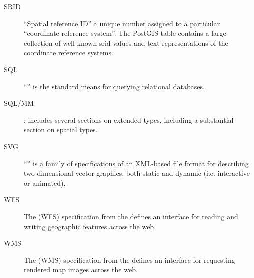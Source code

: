 \documentclass[a4paper,11pt,english]{sphinxmanual}
\begin{document}
\begin{description}
\item[{SRID\label{\detokenize{glossary:term-srid}}}] \leavevmode
“Spatial reference ID” a unique number assigned to a particular “coordinate reference system”. The PostGIS table  contains a large collection of well-known srid values and text representations of the coordinate reference systems.

\item[{SQL\label{\detokenize{glossary:term-sql}}}] \leavevmode
“” is the standard means for querying relational databases.

\item[{SQL/MM\label{\detokenize{glossary:term-sql-mm}}}] \leavevmode
{}; includes several sections on extended types, including a substantial section on spatial types.

\item[{SVG\label{\detokenize{glossary:term-svg}}}] \leavevmode
“” is a family of specifications of an XML-based file format for describing two-dimensional vector graphics, both static and dynamic (i.e. interactive or animated).

\item[{WFS\label{\detokenize{glossary:term-wfs}}}] \leavevmode
The  (WFS) specification from the {\hyperref[\detokenize{glossary:term-ogc}]{}} defines an interface for reading and writing geographic features across the web.

\item[{WMS\label{\detokenize{glossary:term-wms}}}] \leavevmode
The  (WMS) specification from the {\hyperref[\detokenize{glossary:term-ogc}]{}} defines an interface for requesting rendered map images across the web.


\end{description}
\end{document}
